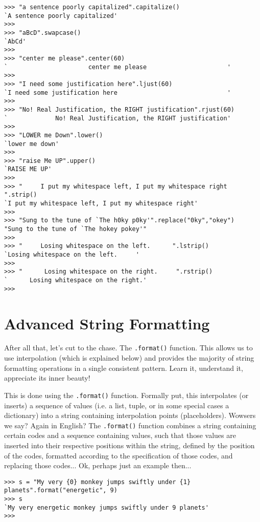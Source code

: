 \begin{lstlisting}
>>> "a sentence poorly capitalized".capitalize()
`A sentence poorly capitalized'
>>>
>>> "aBcD".swapcase()
`AbCd'
>>>
>>> "center me please".center(60)
`                      center me please                      '
>>>
>>> "I need some justification here".ljust(60)
`I need some justification here                              '
>>>
>>> "No! Real Justification, the RIGHT justification".rjust(60)
`             No! Real Justification, the RIGHT justification'
>>>
>>> "LOWER me Down".lower()
`lower me down'
>>>
>>> "raise Me UP".upper()
`RAISE ME UP'
>>>
>>> "     I put my whitespace left, I put my whitespace right     ".strip()
`I put my whitespace left, I put my whitespace right'
>>>
>>> "Sung to the tune of `The h0ky p0ky'".replace("0ky","okey")
"Sung to the tune of `The hokey pokey'"
>>>
>>> "     Losing whitespace on the left.      ".lstrip()
`Losing whitespace on the left.     '
>>>
>>> "      Losing whitespace on the right.     ".rstrip()
`      Losing whitespace on the right.' 
>>>
\end{lstlisting}

\section{Advanced String Formatting}

After all that, let's cut to the chase. The \texttt{.format()} function.   This allows us to use interpolation (which is explained below) and provides the majority of string   formatting operations in a single consistent pattern.  Learn it,   understand it, appreciate its inner beauty!

This is done using the \texttt{.format()} function. Formally put, this interpolates (or inserts) a sequence of   values (i.e. a list, tuple, or in some special cases a dictionary) into   a string containing interpolation points (placeholders). Wowsers we   say? Again in English? The \texttt{.format()} function combines a string   containing certain codes and a sequence containing values, such that   those values are inserted into their respective positions within the   string, defined by the position of the codes, formatted according to   the specification of those codes, and replacing those codes... Ok, perhaps just an example   then...
\begin{lstlisting}
>>> s = "My very {0} monkey jumps swiftly under {1} planets".format("energetic", 9)
>>> s
`My very energetic monkey jumps swiftly under 9 planets'
>>>
\end{lstlisting}

